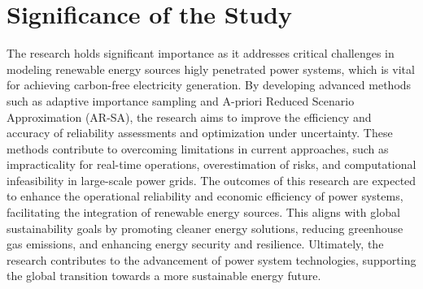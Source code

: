 \section{Significance of the Study}

The research holds significant importance as it addresses critical challenges in modeling renewable energy sources higly penetrated power systems, which is vital for achieving carbon-free electricity generation. By developing advanced methods such as adaptive importance sampling and A-priori Reduced Scenario Approximation (AR-SA), the research aims to improve the efficiency and accuracy of reliability assessments and optimization under uncertainty. These methods contribute to overcoming limitations in current approaches, such as impracticality for real-time operations, overestimation of risks, and computational infeasibility in large-scale power grids. The outcomes of this research are expected to enhance the operational reliability and economic efficiency of power systems, facilitating the integration of renewable energy sources. This aligns with global sustainability goals by promoting cleaner energy solutions, reducing greenhouse gas emissions, and enhancing energy security and resilience. Ultimately, the research contributes to the advancement of power system technologies, supporting the global transition towards a more sustainable energy future.




